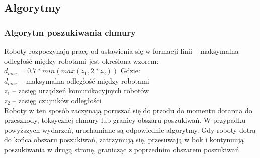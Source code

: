 \documentclass[a4paper, 12pt]{article}
\begin{document}
	\subsection{Algorytmy}
	
	\subsubsection{Algorytm poszukiwania chmury}
	Roboty rozpoczynają pracę od ustawienia się w formacji linii -- maksymalna odległość między robotami jest określona wzorem:
	\begin{math}
	d_{max} = 0.7*min(max(z_1,2*z_2))
	\end{math}
	Gdzie:\\
	$d_{max}$ -- maksymalna odległość między robotami\\
	$z_1$ -- zasięg urządzeń komunikacyjnych robotów\\
	$z_2$ -- zasięg czujników odległości\\
	Roboty w ten sposób zaczynają poruszać się do przodu do momentu dotarcia do przeszkody, toksycznej chmury lub granicy obszaru poszukiwań. W przypadku powyższych wydarzeń, uruchamiane są odpowiednie algorytmy.
	Gdy roboty dotrą do końca obszaru poszukiwań, zatrzymują się, przesuwają w bok i kontynuują poszukiwania w drugą stronę, granicząc z poprzednim obszarem poszukiwań.
\end{document}
